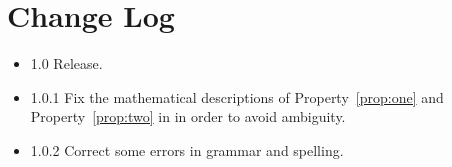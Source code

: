 \section{Change Log}
\begin{itemize}
\item{1.0} Release.
\item{1.0.1} Fix the mathematical descriptions of Property~\ref{prop:one} and Property~\ref{prop:two} in  in order to avoid ambiguity.
\item{1.0.2} Correct some errors in grammar and spelling.
\end{itemize}
